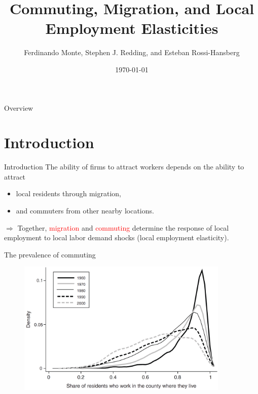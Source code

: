 \documentclass{beamer}
\title[Am. Econ. Rev. 2018]{Commuting, Migration, and Local Employment Elasticities}
\author[Monte, Redding \& Rossi-Hansberg]{Ferdinando Monte, Stephen J. Redding, and Esteban Rossi-Hansberg}
\institute[]{Presenter: Qinzhu Sun}
\date{\today}
\begin{document}
\begin{frame}
	\titlepage
\end{frame}

\begin{frame}{Overview}
	\tableofcontents
\end{frame}
\section{Introduction}
\begin{frame}[shrink]
	\transfade %
	\tableofcontents[sectionstyle=show/shaded,subsectionstyle=show/shaded/hide]
	\addtocounter{framenumber}{-1}
\end{frame}
\begin{frame}{Introduction}
	The ability of firms to attract workers depends on the ability to attract
	\begin{itemize}
		\item local residents through migration,
		\item and commuters from other nearby locations.
	\end{itemize}
	\medskip

	$\Rightarrow$ Together, \textcolor{red}{migration} and \textcolor{red}{commuting} determine the response of local employment to local labor demand shocks (local employment elasticity).
\end{frame}
\begin{frame}{The prevalence of commuting}
	\begin{figure}[htbp]
		\centering
		\includegraphics[width=0.9\textwidth]{fig1.png}
	\end{figure}
\end{frame}
\end{document}
